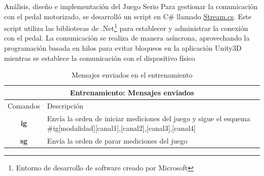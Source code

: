 \begin{thesischapter}{2} {Análisis, diseño e implementación del Juego Serio}
\vspace{10pt} 
Para gestionar la comunicación con el pedal motorizado, se desarrolló un script en C\# llamado \underline{Stream.cs}. Este script utiliza las bibliotecas de .Net\footnote{Entorno de desarrollo de software creado por Microsoft} para establecer y administrar la conexión con el pedal. La comunicación se realiza de manera asíncrona, aprovechando la programación basada en hilos para evitar bloqueos en la aplicación Unity3D mientras se establece la comunicación con el dispositivo físico
    
\vspace{20pt}
\begin{table}[h]
    \centering
    \begin{tabular}{ |c|p{14cm}|}
        \hline
        \multicolumn{2}{|c|}{Entrenamiento: Mensajes enviados} \\
        \hline
        Comandos        &   Descripción \\\hline
        \textbf{ig}     &   \begin{minipage}{14cm}
                                \vspace{2pt}

                                Envía la orden de iniciar mediciones del juego y sigue el esquema \#ig[modalidad][canal1],[canal2],[canal3],[canal4]
                                
                                \vspace{2pt}   
                            \end{minipage}\\\hline 
        \textbf{sg}     &   Envía la orden de parar mediciones del juego \\\hline   
                                
    \end{tabular}
    \caption{Mensajes enviados en el entrenamiento}
    \label{table:send-msg-in-game}
\end{table}


\end{thesischapter}
